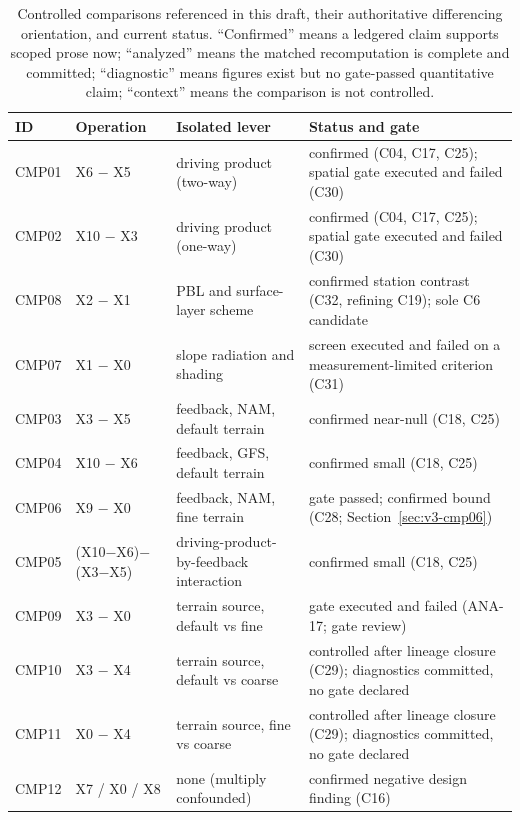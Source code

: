 \documentclass[air,article,submit,moreauthors]{Definitions/mdpi}
\begin{document}
\begin{table}[H]
\caption{Controlled comparisons referenced in this draft, their authoritative differencing orientation, and current status.
``Confirmed'' means a ledgered claim supports scoped prose now; ``analyzed'' means the matched recomputation is complete and committed; ``diagnostic'' means figures exist but no gate-passed quantitative claim; ``context'' means the comparison is not controlled.}
\label{tab:v3-comparisons}
\centering
\small
\begin{tabularx}{\textwidth}{lllL}
\toprule
ID & Operation & Isolated lever & Status and gate \\
\midrule
CMP01 & X6 $-$ X5 & driving product (two-way) & confirmed (C04, C17, C25); spatial gate executed and failed (C30) \\
CMP02 & X10 $-$ X3 & driving product (one-way) & confirmed (C04, C17, C25); spatial gate executed and failed (C30) \\
CMP08 & X2 $-$ X1 & PBL and surface-layer scheme & confirmed station contrast (C32, refining C19); sole C6 candidate \\
CMP07 & X1 $-$ X0 & slope radiation and shading & screen executed and failed on a measurement-limited criterion (C31) \\
CMP03 & X3 $-$ X5 & feedback, NAM, default terrain & confirmed near-null (C18, C25) \\
CMP04 & X10 $-$ X6 & feedback, GFS, default terrain & confirmed small (C18, C25) \\
CMP06 & X9 $-$ X0 & feedback, NAM, fine terrain & gate passed; confirmed bound (C28; Section~\ref{sec:v3-cmp06}) \\
CMP05 & (X10$-$X6)$-$(X3$-$X5) & driving-product-by-feedback interaction & confirmed small (C18, C25) \\
CMP09 & X3 $-$ X0 & terrain source, default vs fine & gate executed and failed (ANA-17; gate review) \\
CMP10 & X3 $-$ X4 & terrain source, default vs coarse & controlled after lineage closure (C29); diagnostics committed, no gate declared \\
CMP11 & X0 $-$ X4 & terrain source, fine vs coarse & controlled after lineage closure (C29); diagnostics committed, no gate declared \\
CMP12 & X7 / X0 / X8 & none (multiply confounded) & confirmed negative design finding (C16) \\
\bottomrule
\end{tabularx}
\end{table}
\end{document}
